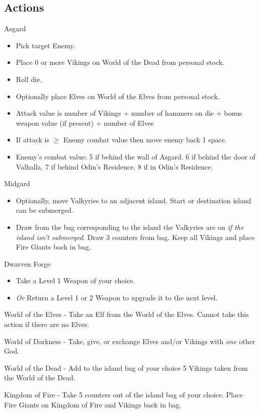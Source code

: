 \documentclass[12pt]{article}
\newenvironment{itemizeCustom}
{\begin{itemize}
  \setlength{\itemsep}{1pt}
  \setlength{\parskip}{0pt}
  \setlength{\parsep}{0pt}}
{\end{itemize}}
\begin{document}
\begin{mdframed}[style = customFrame]
\begin{multicols*}{2}
\section*{Actions}
Asgard
\begin{itemizeCustom}
	\item Pick target Enemy.
	\item Place 0 or more Vikings on World of the Dead from personal stock.
	\item Roll die.
	\item Optionally place Elves on World of the Elves from personal stock.
	\item Attack value is number of Vikings + number of hammers on die + bonus weapon value (if present) + number of Elves
	\item If attack is $\ge$ Enemy combat value then move enemy back 1 space.
	\item Enemy's combat value: 5 if behind the wall of Asgard. 6 if behind the door of Valhalla. 7 if behind Odin's Residence. 8 if in Odin's Residence.
\end{itemizeCustom}

\noindent
Midgard
\begin{itemizeCustom}
	\item Optionally, move Valkyries to an adjacent island. Start or destination island can be submerged.
	\item Draw from the bag corresponding to the island the Valkyries are on \emph{if the island isn't submerged}. Draw 3 counters from bag. Keep all Vikings and place Fire Giants back in bag.
\end{itemizeCustom}

\noindent
Dwarven Forge
\begin{itemizeCustom}
	\item Take a Level 1 Weapon of your choice.
	\item \emph{Or} Return a Level 1 or 2 Weapon to upgrade it to the next level.
\end{itemizeCustom}

\noindent
World of the Elves - Take an Elf from the World of the Elves. Cannot take this action if there are no Elves.

\noindent
World of Darkness - Take, give, or exchange Elves and/or Vikings with \emph{one} other God.

\noindent
World of the Dead - Add to the island bag of your choice 5 Vikings taken from the World of the Dead.

\noindent
Kingdom of Fire - Take 5 counters out of the island bag of your choice. Place Fire Giants on Kingdom of Fire and Vikings back in bag.


\end{multicols*}
\end{mdframed}
\end{document}
